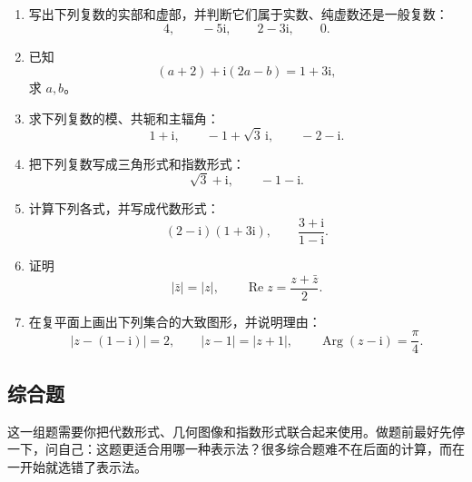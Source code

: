 \begin{enumerate}
    \item 写出下列复数的实部和虚部，并判断它们属于实数、纯虚数还是一般复数：
    \[
        4,\qquad -5\mathrm{i},\qquad 2-3\mathrm{i},\qquad 0.
    \]

    \item 已知
    \[
        (a+2)+\mathrm{i}(2a-b)=1+3\mathrm{i},
    \]
    求 $a,b$。

    \item 求下列复数的模、共轭和主辐角：
    \[
        1+\mathrm{i},\qquad -1+\sqrt{3}\,\mathrm{i},\qquad -2-\mathrm{i}.
    \]

    \item 把下列复数写成三角形式和指数形式：
    \[
        \sqrt{3}+\mathrm{i},\qquad -1-\mathrm{i}.
    \]

    \item 计算下列各式，并写成代数形式：
    \[
        (2-\mathrm{i})(1+3\mathrm{i}),\qquad \frac{3+\mathrm{i}}{1-\mathrm{i}}.
    \]

    \item 证明
    \[
        |\bar z|=|z|,\qquad \operatorname{Re}z=\frac{z+\bar z}{2}.
    \]

    \item 在复平面上画出下列集合的大致图形，并说明理由：
    \[
        |z-(1-\mathrm{i})|=2,\qquad |z-1|=|z+1|,\qquad \operatorname{Arg}(z-\mathrm{i})=\frac{\pi}{4}.
    \]
\end{enumerate}

\subsection{综合题}

这一组题需要你把代数形式、几何图像和指数形式联合起来使用。做题前最好先停一下，问自己：这题更适合用哪一种表示法？很多综合题难不在后面的计算，而在一开始就选错了表示法。

